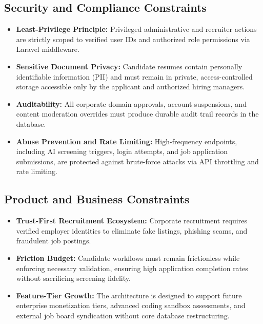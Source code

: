 \subsection{Security and Compliance Constraints}
\begin{itemize}
    \item \textbf{Least-Privilege Principle:} Privileged administrative and recruiter actions are strictly scoped to verified user IDs and authorized role permissions via Laravel middleware.
    \item \textbf{Sensitive Document Privacy:} Candidate resumes contain personally identifiable information (PII) and must remain in private, access-controlled storage accessible only by the applicant and authorized hiring managers.
    \item \textbf{Auditability:} All corporate domain approvals, account suspensions, and content moderation overrides must produce durable audit trail records in the database.
    \item \textbf{Abuse Prevention and Rate Limiting:} High-frequency endpoints, including AI screening triggers, login attempts, and job application submissions, are protected against brute-force attacks via API throttling and rate limiting.
\end{itemize}

\subsection{Product and Business Constraints}
\begin{itemize}
    \item \textbf{Trust-First Recruitment Ecosystem:} Corporate recruitment requires verified employer identities to eliminate fake listings, phishing scams, and fraudulent job postings.
    \item \textbf{Friction Budget:} Candidate workflows must remain frictionless while enforcing necessary validation, ensuring high application completion rates without sacrificing screening fidelity.
    \item \textbf{Feature-Tier Growth:} The architecture is designed to support future enterprise monetization tiers, advanced coding sandbox assessments, and external job board syndication without core database restructuring.
\end{itemize}

